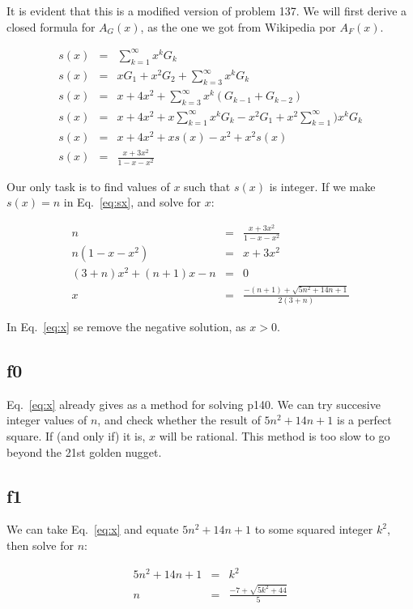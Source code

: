 \documentclass[english]{article}
\begin{document}
It is evident that this is a modified version of problem 137. We will first derive a closed formula for $A_G(x)$, as the one we got from Wikipedia por $A_F(x)$.

\begin{eqnarray}
s(x) & = & \sum_{k=1}^{\infty} x^k G_k \\
s(x) & = & x G_1 + x^2 G_2 + \sum_{k=3}^{\infty} x^k G_k \\
s(x) & = & x + 4x^2 + \sum_{k=3}^{\infty} x^k (G_{k-1} + G_{k-2}) \\
s(x) & = & x + 4x^2 + x \sum_{k=1}^{\infty} x^k G_k - x^2 G_1 + x^2 \sum_{k=1}^{\infty}) x^k G_k \\
s(x) & = & x + 4x^2 + x s(x) - x^2 + x^2 s(x) \\
s(x) & = & \frac{x+3x^2}{1-x-x^2} \label{eq:sx}
\end{eqnarray}

Our only task is to find values of $x$ such that $s(x)$ is integer. If we make $s(x) = n$ in Eq.~\ref{eq:sx}, and solve for $x$:

\begin{eqnarray}
n & = & \frac{x + 3x^2}{1-x-x^2} \\
n (1-x-x^2) & = & x + 3x^2\\
(3+n)x^2 + (n+1) x - n & = & 0 \\
x & = & \frac{-(n+1)+\sqrt{5n^2+14n+1}}{2(3+n)} \label{eq:x}
\end{eqnarray}

In Eq.~\ref{eq:x} se remove the negative solution, as $x > 0$.

\subsection{f0}

Eq.~\ref{eq:x} already gives as a method for solving p140. We can try succesive integer values of $n$, and check whether the result of $5n^2+14n+1$ is a perfect square. If (and only if) it is, $x$ will be rational. This method is too slow to go beyond the 21st golden nugget.

\subsection{f1}

We can take Eq.~\ref{eq:x} and equate $5n^2+14n+1$ to some squared integer $k^2$, then solve for $n$:

\begin{eqnarray}
5n^2+14n+1 & = & k^2 \\
n & = & \frac{-7+\sqrt{5k^2+44}}{5} \label{eq:n}
\end{eqnarray}
\end{document}

